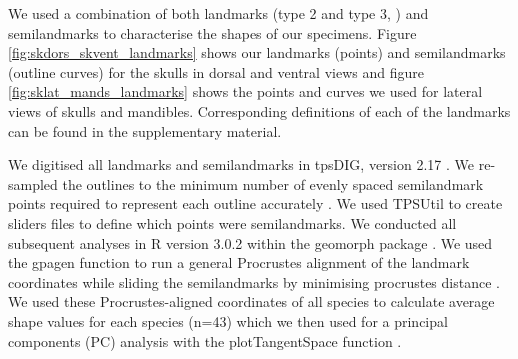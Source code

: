\documentclass[12pt,a4paper]{article}
\begin{document}
	We used a combination of both landmarks (type 2 and type 3, \citep{Zelditch2012}) and semilandmarks to characterise the shapes of our specimens. Figure \ref{fig:skdors_skvent_landmarks} shows our landmarks (points) and semilandmarks (outline curves) for the skulls in dorsal and ventral views and figure \ref{fig:sklat_mands_landmarks} shows the points and curves we used for lateral views of skulls and mandibles. Corresponding definitions of each of the landmarks can be found in the supplementary material.
	
	

	We digitised all landmarks and semilandmarks in tpsDIG, version 2.17 \citep{Rohlf2013}. We re-sampled the outlines to the minimum number of evenly spaced semilandmark points required to represent each outline accurately \citep[][details in supplementary material]{MacLeod2013}. We used TPSUtil \citep{Rohlf2012} to create sliders files \citep{Zelditch2012} to define which points were semilandmarks. We conducted all subsequent analyses in R version 3.0.2 \citep{Team2014} within the geomorph package \citep{Adams2013}. We used the gpagen function to run a general Procrustes alignment \citep{Rohlf1993} of the landmark coordinates while sliding the semilandmarks by minimising procrustes distance \citep{Bookstein1997}. We used these Procrustes-aligned coordinates of all species to calculate average shape values for each species (n=43) which we then used for a principal components (PC) analysis with the plotTangentSpace function \citep{Adams2013}. 

\end{document}

